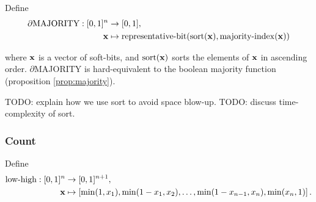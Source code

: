 \documentclass{article} %
\begin{document}



Define
\begin{equation*}
\begin{aligned}
	\partial\text{MAJORITY}: [0,1]^{n} &\to [0,1], \\
	{\bf x} &\mapsto \operatorname{representative-bit}(\operatorname{sort}({\bf x}), \operatorname{majority-index}({\bf x}))
\end{aligned}
\end{equation*}

where ${\bf x}$ is a vector of soft-bits, and $\operatorname{sort}({\bf x})$ sorts the elements of ${\bf x}$ in ascending order.
$\partial${MAJORITY} is hard-equivalent to the boolean majority function (proposition \ref{prop:majority}).

TODO: explain how we use sort to avoid space blow-up.
TODO: discuss time-complexity of sort.

\subsubsection{Count}

Define 
\begin{equation*}
\begin{aligned}
\operatorname{low-high}: [0,1]^{n} &\to [0,1]^{n+1},\\
{\bf x} &\mapsto \left[ \operatorname{min}(1, x_{1}), \operatorname{min}(1 - x_{1}, x_{2}), \dots, \operatorname{min}(1 - x_{n-1}, x_{n}), \operatorname{min}(x_{n}, 1) \right]\text{.}
\end{aligned}
\end{equation*}
\end{document}
